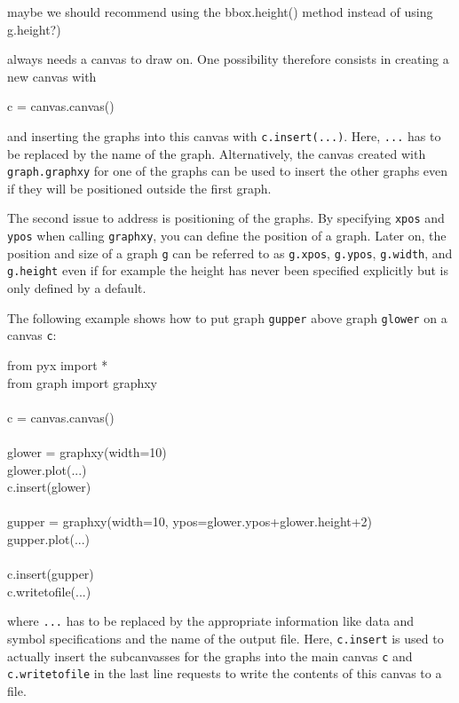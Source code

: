 \documentclass[11pt,DIV14]{scrartcl}
\begin{document}
{maybe we should recommend using the bbox.height() method instead of
  using g.height?)}
{\PyX{} always needs a canvas to draw on. One possibility therefore consists
in creating a new canvas with
\begin{progcode}
c = canvas.canvas()
\end{progcode}
and inserting the graphs into this canvas with \texttt{c.insert(...)}. Here,
\texttt{...} has to be replaced by the name of the graph. Alternatively, the
canvas created with \texttt{graph.graphxy} for one of the graphs can be used
to insert the other graphs even if they will be positioned outside the
first graph.

The second issue to address is positioning of the graphs. By specifying
\texttt{xpos} and \texttt{ypos} when calling \texttt{graphxy}, you can
define the position of a graph. Later on, the position and size of a 
graph \texttt{g} can be referred to as \texttt{g.xpos}, \texttt{g.ypos},
\texttt{g.width}, and \texttt{g.height} even if for example the height has 
never been specified explicitly but is only defined by a \PyX{} default. 

The following example shows how to put graph \texttt{gupper} above graph 
\texttt{glower} on a canvas \texttt{c}:
\begin{progcode}
from pyx import *\\
from graph import graphxy\\
\\
c = canvas.canvas()\\
\\
glower = graphxy(width=10)\\
glower.plot(...)\\
c.insert(glower)\\
\\
gupper = graphxy(width=10, ypos=glower.ypos+glower.height+2)\\
gupper.plot(...)\\
\\
c.insert(gupper)\\
c.writetofile(...)
\end{progcode}
where \texttt{...} has to be replaced by the appropriate information like
data and symbol specifications and the name of the output file. Here,
\texttt{c.insert} is used to actually insert the subcanvasses 
for the graphs into the main canvas \texttt{c} and \texttt{c.writetofile}
in the last line requests to write the contents of this canvas to a file.

%
}
\end{document}
